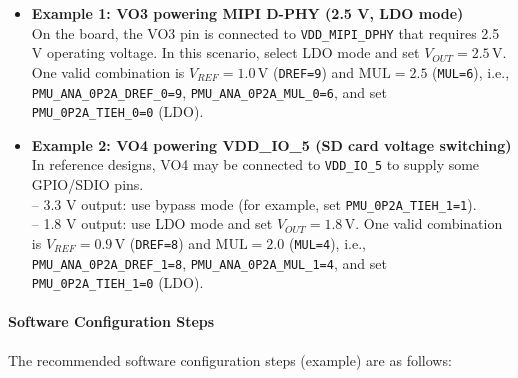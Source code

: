 \documentclass[main\_\_EN.tex]{subfiles}
\begin{document}
\begin{itemize}
    \begin{itemize}
    \item \textbf{Example 1: VO3 powering MIPI D-PHY (2.5 V, LDO mode)}\\
    On the board, the VO3 pin is connected to \texttt{VDD\_MIPI\_DPHY} that requires 2.5 V operating voltage. In this scenario, select LDO mode and set \(V_{OUT}=2.5\,\mathrm{V}\). One valid combination is \(V_{REF}=1.0\,\mathrm{V}\) (\texttt{DREF=9}) and \(\mathrm{MUL}=2.5\) (\texttt{MUL=6}), i.e., \texttt{PMU\_ANA\_0P2A\_DREF\_0=9}, \texttt{PMU\_ANA\_0P2A\_MUL\_0=6}, and set \texttt{PMU\_0P2A\_TIEH\_0=0} (LDO).
    \item \textbf{Example 2: VO4 powering VDD\_IO\_5 (SD card voltage switching)}\\
    In reference designs, VO4 may be connected to \texttt{VDD\_IO\_5} to supply some GPIO/SDIO pins.\\
    -- 3.3 V output: use bypass mode (for example, set \texttt{PMU\_0P2A\_TIEH\_1=1}).\\
    -- 1.8 V output: use LDO mode and set \(V_{OUT}=1.8\,\mathrm{V}\). One valid combination is \(V_{REF}=0.9\,\mathrm{V}\) (\texttt{DREF=8}) and \(\mathrm{MUL}=2.0\) (\texttt{MUL=4}), i.e., \texttt{PMU\_ANA\_0P2A\_DREF\_1=8}, \texttt{PMU\_ANA\_0P2A\_MUL\_1=4}, and set \texttt{PMU\_0P2A\_TIEH\_1=0} (LDO).
    \end{itemize}

    \paragraph{Software Configuration Steps}

    The recommended software configuration steps (example) are as follows:


\end{itemize}
\end{document}
